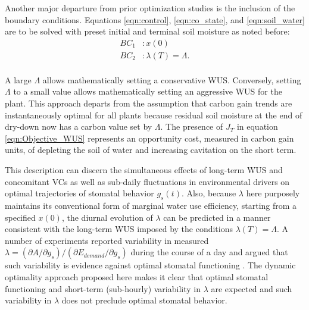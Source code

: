 \documentclass[utf8]{frontiersSCNS} %
\begin{document}
Another major departure from prior optimization studies is the inclusion of the boundary conditions. Equations \ref{eqn:control}, \ref{eqn:co_state}, and \ref{eqn:soil_water} are to be solved with preset initial and terminal soil moisture as noted before:
\begin{equation}
\label{eqn: BC_WUS}
    \begin{split}
        BC_1 &:x(0)\\
        BC_2 &:\lambda(T) = \Lambda.\\
    \end{split}
\end{equation}



A large $\Lambda$ allows mathematically setting a conservative WUS.  Conversely, setting $\Lambda$ to a small value allows mathematically setting an aggressive WUS for the plant. This approach departs from the assumption that carbon gain trends are instantaneously optimal for all plants because residual soil moisture at the end of dry-down now has a carbon value set by $\Lambda$. The presence of $J_{T}$ in equation \ref{eqn:Objective_WUS} represents an opportunity cost, measured in carbon gain units, of depleting the soil of water and increasing cavitation on the short term.

This description can discern the simultaneous effects of long-term WUS and concomitant VCs as well as sub-daily fluctuations in environmental drivers on optimal trajectories of stomatal behavior $g_s(t)$.  Also, because $\lambda$ here purposely maintains its conventional form of marginal water use efficiency, starting from a specified $x(0)$, the diurnal evolution of $\lambda$ can be predicted in a manner consistent with the long-term WUS imposed by the conditions $\lambda(T)=\Lambda$.  A number of experiments reported variability in measured $\lambda=(\partial A/\partial g_s)/(\partial E_{demand}/\partial g_s)$ during the course of a day and argued that such variability is evidence against optimal stomatal functioning \citep{fites1988co2}.  The dynamic optimality approach proposed here makes it clear that optimal stomatal functioning and short-term (sub-hourly) variability in $\lambda$ are expected and such variability in $\lambda$ does not preclude optimal stomatal behavior.
\end{document}
